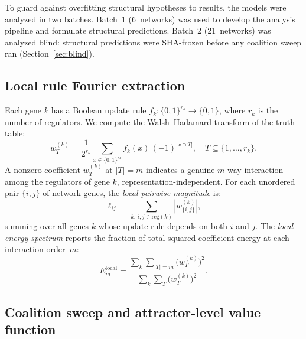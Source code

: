 \documentclass[10pt]{article}
\begin{document}
To guard against overfitting structural hypotheses to results, the
models were analyzed in two batches. Batch~1 (6~networks) was used to
develop the analysis pipeline and formulate structural predictions.
Batch~2 (21~networks) was analyzed blind: structural predictions were
SHA-frozen before any coalition sweep ran
(Section~\ref{sec:blind}).


\subsection{Local rule Fourier extraction}
\label{sec:local-fourier}

Each gene $k$ has a Boolean update rule $f_k\colon \{0,1\}^{r_k}
\to \{0,1\}$, where $r_k$ is the number of regulators. We compute
the Walsh--Hadamard transform of the truth table:
%
\begin{equation}
\label{eq:local-wht}
w_T^{(k)} = \frac{1}{2^{r_k}} \sum_{x \in \{0,1\}^{r_k}} f_k(x)\,(-1)^{|x \cap T|},
\quad T \subseteq \{1, \ldots, r_k\}.
\end{equation}
%
A nonzero coefficient $w_T^{(k)}$ at $|T| = m$ indicates a genuine
$m$-way interaction among the regulators of gene $k$,
representation-independent. For each unordered pair $\{i,j\}$ of
network genes, the \emph{local pairwise magnitude} is:
%
\begin{equation}
\label{eq:local-pair}
\ell_{ij} = \sum_{k:\, i,j \in \mathrm{reg}(k)} |w_{\{i,j\}}^{(k)}|,
\end{equation}
%
summing over all genes $k$ whose update rule depends on both $i$ and
$j$. The \emph{local energy spectrum} reports the fraction of total
squared-coefficient energy at each interaction order~$m$:
%
\begin{equation}
\label{eq:local-spectrum}
E_m^{\mathrm{local}} = \frac{\sum_k \sum_{|T|=m} \bigl(w_T^{(k)}\bigr)^2}
{\sum_k \sum_T \bigl(w_T^{(k)}\bigr)^2}.
\end{equation}


\subsection{Coalition sweep and attractor-level value function}
\label{sec:coalition-sweep}
\end{document}
